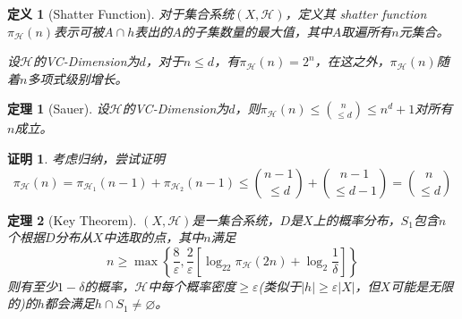 \documentclass[8pt]{article}
\theoremstyle{compact}
\newtheorem{theorem}{定理}
\newtheorem{definition}{定义}
\newtheorem{Proof}{证明}
\def\le{\leqslant}
\def\ge{\geqslant}
\begin{document}
\begin{definition}[Shatter Function]
	对于集合系统$(X, \mathcal H)$，定义其 shatter function $\pi_{\mathcal H}(n)$表示可被$A \cap h$表出的$A$的子集数量的最大值，其中$A$取遍所有$n$元集合。
	
	设$\mathcal H$的VC-Dimension为$d$，对于$n \le d$，有$\pi_{\mathcal H}(n) = 2^n$，在这之外，$\pi_{\mathcal H}(n)$随着$n$多项式级别增长。
\end{definition}
\begin{theorem}[Sauer]
	设$\mathcal H$的VC-Dimension为$d$，则$\pi_{\mathcal H}(n) \le \binom{n}{ \le d} \le n^d + 1$对所有$n$成立。
\end{theorem}
\begin{Proof}
	考虑归纳，尝试证明\begin{equation}
	\pi_{\mathcal H}(n) = \pi_{\mathcal H_1}(n-1) + \pi_{\mathcal H_2}(n-1) \le \binom{n-1}{\le d} + \binom{n-1}{\le d-1} = \binom{n}{\le d}
	\end{equation}
\end{Proof}
\begin{theorem}[Key Theorem]
	$(X, \mathcal H)$是一集合系统，$D$是$X$上的概率分布，$S_1$包含$n$个根据$D$分布从$X$中选取的点，其中$n$满足
	\begin{equation}
		n \ge \max\left\{ \frac{8}{\varepsilon}, \frac{2}{\varepsilon}\left[ \log_22\pi_{\mathcal H}(2n) + \log_2\frac{1}{\delta} \right] \right\}
	\end{equation}
	则有至少$1 - \delta$的概率，$\mathcal H$中每个概率密度$\ge \varepsilon$(类似于$|h| \ge \varepsilon|X|$，但$X$可能是无限的)的$h$都会满足$h \cap S_1 \neq \varnothing$。
\end{theorem}
\end{document}
